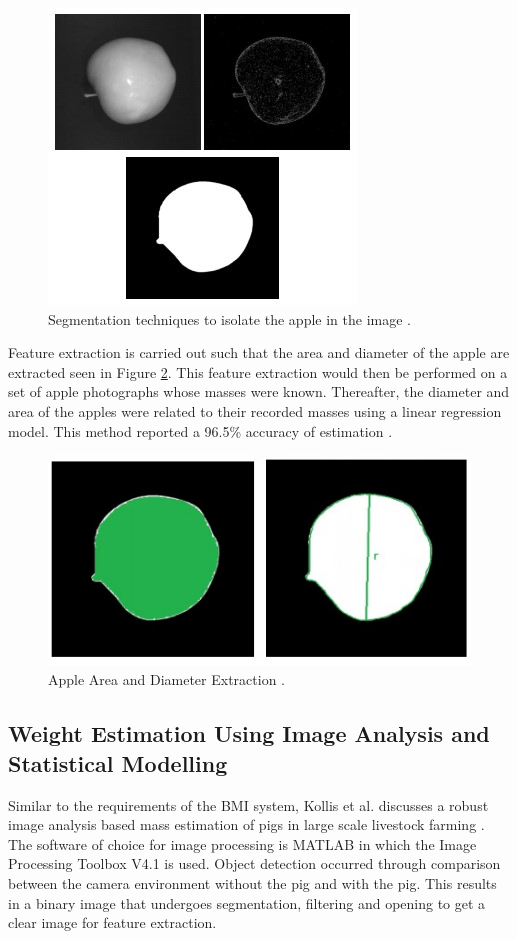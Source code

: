 \documentclass[conference]{IEEEtran}
\begin{document}
\begin{figure}
    \centering
    \includegraphics[width=0.7\linewidth]{segmentedapples.jpg}
    \caption{Segmentation techniques to isolate the apple in the image \cite{comert}.}
    \label{fig:segmentedapples}
\end{figure}

Feature extraction is carried out such that the area and diameter of the apple are extracted seen in Figure \ref{fig:diameterapples}.
This feature extraction would then be performed on a set of apple photographs whose masses were known.
Thereafter, the diameter and area of the apples were related to their recorded masses using a linear regression model.
This method reported a 96.5\% accuracy of estimation \cite{comert}.

\begin{figure}
    \centering
    \includegraphics[width=0.7\linewidth]{diameterapples.jpg}
    \caption{Apple Area and Diameter Extraction  \cite{comert}.}
    \label{fig:diameterapples}
\end{figure}

\subsection{Weight Estimation Using Image Analysis and Statistical Modelling}
Similar to the requirements of the BMI system, Kollis et al. discusses a robust image analysis based mass estimation of pigs in large scale livestock farming \cite{kollis2007weight}. 
The software of choice for image processing is MATLAB in which the Image Processing Toolbox V4.1 is used.
Object detection occurred through comparison between the camera environment without the pig and with the pig.
This results in a binary image that undergoes segmentation, filtering and opening to get a clear image for feature extraction.
\end{document}
